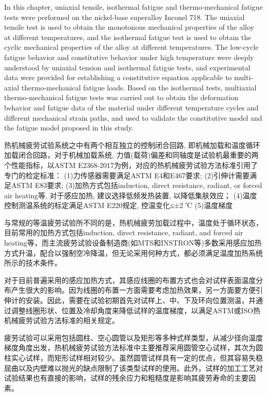 In this chapter, uniaxial tensile, isothermal fatigue and thermo-mechanical fatigue tests were performed on the nickel-base superalloy Inconel 718. The uniaxial tensile test is used to obtain the monotonous mechanical properties of the alloy at different temperatures, and the isothermal fatigue test is used to obtain the cyclic mechanical properties of the alloy at different temperatures. The low-cycle fatigue behavior and constitutive behavior under high temperature were deeply understood by uniaxial tension and isothermal fatigue tests, and experimental data were provided for establishing a constitutive equation applicable to multi-axial thermo-mechanical fatigue loads. Based on the isothermal tests, multiaxial thermo-mechanical fatigue tests was carried out to obtain the deformation behavior and fatigue data of the material under different temperature cycles and different mechanical strain paths, and used to validate the constitutive model and the fatigue model proposed in this study.

热机械疲劳试验系统之中有两个相互独立的控制闭合回路, 即机械加载和温度循环加载闭合回路，对于机械加载系统, 力值(载荷)偏差和同轴度是试验机最重要的两个性能指标，以ASTM E2368-2017为例，对应的热机械疲劳试验方法标准引用了专门的检定标准：
(1)力传感器需要满足ASTM E4和E467要求;
(2)引伸计需要满足ASTM E83要求;
(3)加热方式包括induction, direct resistance, radiant, or forced air heating等, 对于感应加热, 建议选择低频发热装置, 以降低集肤效应；
(4)温度控制测温系统的标定满足ASTM E220规定, 控温变化≤±2 ℃
(5)温度梯度

与常规的等温疲劳试验所不同的是，热机械疲劳加载过程中，温度处于循环状态，目前常用的加热方式包括induction, direct resistance, radiant, and forced air heating等，而主流疲劳试验设备制造商(如MTS和INSTRON等)多数采用感应加热方式升温，配合以强制空冷降温，但无论采用何种方式，都必须满足温度加热系统所示的技术条件。

对于目前普遍采用的感应加热方式，其感应线圈的布置方式也会对试样表面温度分布产生很大的影响。因为线圈的布置一方面需要考虑加热效果，另一方面要方便引伸计的安装\cite{Hahner2006}。因此，需要在试验初期首先对试样上、中、下及环向位置测温，并通过调整线圈形状、位置及冷却角度来降低试样的温度梯度，以满足ASTM或ISO热机械疲劳试验方法标准的相关规定。

疲劳试验可以采用包括圆柱、空心圆管以及矩形等多种式样类型，从减少径向温度梯度角度出发，热机械疲劳试验方法标准中主要推荐采用圆管空心试样，其次为圆柱实心试样，而矩形试样相对较少。虽然圆管试样具有一定的优点，但其容易失稳屈曲以及内壁难以抛光的缺点限制了该类型试样的使用。此外，试样的加工工艺对试验结果也有直接的影响，试样的残余应力和粗糙度是影响其疲劳寿命的主要因素。
